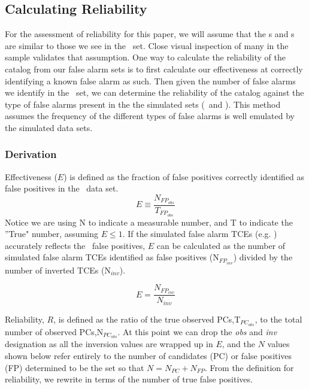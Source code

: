 

\newcommand{\opsfp}{N$_{FP_{obs}}$}
\newcommand{\opspc}{N$_{PC_{obs}}$}
\newcommand{\opsN}{N$_{obs}$}
\newcommand{\trueopspc}{T$_{PC_{obs}}$}
\newcommand{\missedfp}{T$_{FP_{obs}}$ - N$_{FP_{obs}}$}
\newcommand{\invfp}{N$_{FP_{inv}}$}
\newcommand{\invpc}{N$_{PC_{inv}}$}
\newcommand{\invN}{N$_{inv}$}
\newcommand{\sfatce}{SFA-TCE}


\subsection{Calculating Reliability}
For the assessment of reliability for this paper, we will assume that the \scrtce s and \invtce s are similar to those we see in the \opstce\ set. Close visual inspection of many in the sample validates that assumption.  One way to calculate the reliability of the catalog from our false alarm sets is to first calculate our effectiveness at correctly identifying a known false alarm as such.  Then given the number of false alarms we identify in the \opstce\ set, we can determine the reliability of the catalog against the type of false alarms present in the the simulated sets (\invtce\ and \scrtce). This method assumes the frequency of the different types of false alarms is well emulated by the simulated data sets. 

\subsubsection{Derivation}

Effectiveness ($E$) is defined as the fraction of false positives correctly identified as false positives in the \opstce\ data set. 
\begin{equation}
\label{effect1}
E \equiv \frac{N_{FP_{obs}}}{T_{FP_{obs}}}
\end{equation}
Notice we are using N to indicate a measurable number, and T to indicate the ''True" number, assuming $E\leq 1 $.  If the simulated false alarm TCEs (e.g. \invtce) accurately reflects the \opstce\ false positives, $E$ can be calculated as the number of simulated false alarm TCEs identified as false positives (\invfp) divided by the number of inverted TCEs (\invN). 

\begin{equation}
\label{effect2}
E = \frac{N_{FP_{inv}}}{N_{inv}}
\end{equation}

Reliability, $R$, is defined as the ratio of the true observed PCs,\trueopspc, to the total number of observed PCs,\opspc. At this point we can drop the \textit{obs} and \textit{inv} designation as all the inversion values are wrapped up in $E$, and the $N$ values shown below refer entirely to the number of candidates (PC) or false positives (FP) determined to be the \opstce set so that $N=N_{PC} + N_{FP}$. From the definition for reliability, we rewrite in terms of the number of true false positives.

